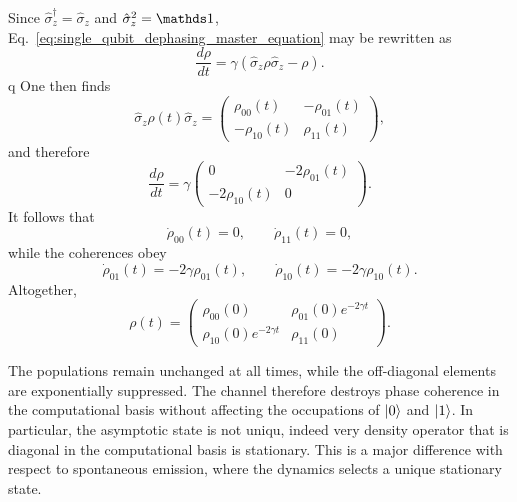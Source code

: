 Since \(\hat \sigma_z^\dagger=\hat \sigma_z\) and \(\hat \sigma_z^2=\id\), Eq.~\eqref{eq:single_qubit_dephasing_master_equation} may be rewritten as
\begin{equation}
	\frac{d\rho}{dt}
	=
	\gamma
	\left(
	\hat \sigma_z \rho \hat \sigma_z
	-
	\rho
	\right).
	\label{eq:single_qubit_dephasing_master_equation_compact}
\end{equation}q
One then finds
\begin{equation}
	\hat \sigma_z \rho(t) \hat \sigma_z
	=
	\begin{pmatrix}
		\rho_{00}(t) & -\rho_{01}(t) \\
		-\rho_{10}(t) & \rho_{11}(t)
	\end{pmatrix},
	\label{eq:single_qubit_dephasing_sigma_z_rho_sigma_z}
\end{equation}
and therefore
\begin{equation}
	\frac{d\rho}{dt}
	=
	\gamma
	\begin{pmatrix}
		0 & -2\rho_{01}(t) \\
		-2\rho_{10}(t) & 0
	\end{pmatrix}.
	\label{eq:single_qubit_dephasing_matrix_equation}
\end{equation}
It follows that
\begin{equation}
	\dot{\rho}_{00}(t)=0,
	\qquad
	\dot{\rho}_{11}(t)=0,
	\label{eq:single_qubit_dephasing_populations}
\end{equation}
while the coherences obey
\begin{equation}
	\dot{\rho}_{01}(t)=-2\gamma \rho_{01}(t),
	\qquad
	\dot{\rho}_{10}(t)=-2\gamma \rho_{10}(t).
	\label{eq:single_qubit_dephasing_coherences}
\end{equation}
Altogether,
\begin{equation}
	\rho(t)
	=
	\begin{pmatrix}
		\rho_{00}(0) & \rho_{01}(0)e^{-2\gamma t} \\
		\rho_{10}(0)e^{-2\gamma t} & \rho_{11}(0)
	\end{pmatrix}.
	\label{eq:single_qubit_dephasing_full_solution}
\end{equation}

The populations remain unchanged at all times, while the off-diagonal elements are exponentially suppressed. The channel therefore destroys phase coherence in the computational basis without affecting the occupations of \(\ket{0}\) and \(\ket{1}\). In particular, the asymptotic state is not uniqu, indeed very density operator that is diagonal in the computational basis is stationary.
This is a major difference with respect to spontaneous emission, where the dynamics selects a unique stationary state.


